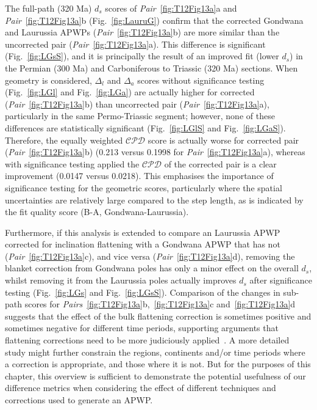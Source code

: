 The full-path (320 Ma) $d_s$ scores of
\emph{Pair}~\ref{fig:T12Fig13a}a and \emph{Pair}~\ref{fig:T12Fig13a}b
(Fig.~\ref{fig:LauruG}) confirm that the corrected Gondwana and Laurussia
APWPs (\emph{Pair}~\ref{fig:T12Fig13a}b) are more similar than the uncorrected
pair (\emph{Pair}~\ref{fig:T12Fig13a}a). This difference is significant
(Fig.~\ref{fig:LGsS}), and it is principally the result of an improved fit
(lower $d_s$) in the Permian (300 Ma) and Carboniferous to
Triassic (320 Ma) sections. When geometry is considered,
$\Delta_l$ and $\Delta_a$ scores without significance testing
(Fig.~\ref{fig:LGl} and Fig.~\ref{fig:LGa}) are actually higher for corrected
(\emph{Pair}~\ref{fig:T12Fig13a}b) than uncorrected pair
(\emph{Pair}~\ref{fig:T12Fig13a}a), particularly in the same Permo-Triassic
segment; however, none of these differences are statistically significant
(Fig.~\ref{fig:LGlS} and Fig.~\ref{fig:LGaS}). Therefore, the equally weighted
$\mathcal{CPD}$ score is actually worse for corrected pair
(\emph{Pair}~\ref{fig:T12Fig13a}b) (0.213 versus 0.1998 for
\emph{Pair}~\ref{fig:T12Fig13a}a), whereas with significance testing applied the
$\mathcal{CPD}$ of the corrected pair is a clear improvement (0.0147 versus
0.0218). This emphasises the importance of significance testing for the
geometric scores, particularly where the spatial uncertainties are relatively
large compared to the step length, as is indicated by the fit quality score
(B-A, Gondwana-Laurussia).

Furthermore, if this analysis is extended to compare an Laurussia APWP corrected
for inclination flattening with a Gondwana APWP that has not
(\emph{Pair}~\ref{fig:T12Fig13a}c), and vice versa
(\emph{Pair}~\ref{fig:T12Fig13a}d), removing the blanket correction from
Gondwana poles has only a minor effect on the overall $d_s$, whilst removing it
from the Laurussia poles actually improves $d_s$ after significance testing
(Fig.~\ref{fig:LGs} and Fig.~\ref{fig:LGsS}). Comparison of the changes in
sub-path scores for \emph{Pairs}~\ref{fig:T12Fig13a}b,~\ref{fig:T12Fig13a}c
and~\ref{fig:T12Fig13a}d suggests that the effect of the bulk flattening
correction is sometimes positive and sometimes negative for different time
periods, supporting arguments that flattening corrections need to be more
judiciously applied~\cite[for example]{B10,B16}. A more detailed study might
further constrain the regions, continents and/or time periods where a correction
is appropriate, and those where it is not. But for the purposes of this chapter,
this overview is sufficient to demonstrate the potential usefulness of our
difference metrics when considering the effect of different techniques and
corrections used to generate an APWP\@.

